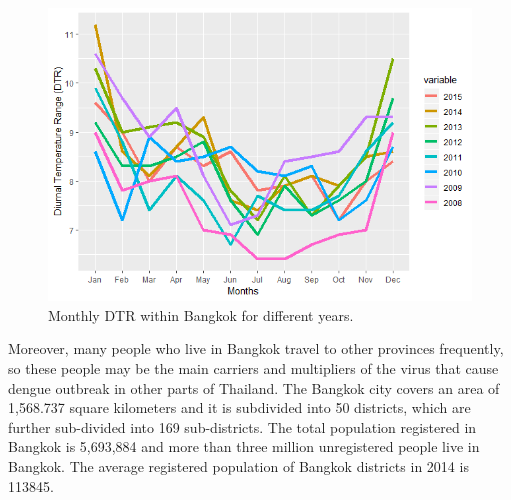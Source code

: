 \documentclass{bmcart}
\begin{document}
\begin{figure}[htbp]
	\begin{center}
		\includegraphics[width= 1.0\textwidth]{2-AvgMonthlyDTR}
		\caption{Monthly DTR within Bangkok for different years.}
		\label{figure-avg_temp_bangkok}
	\end{center}
\end{figure}


Moreover, many people who live in Bangkok travel to other provinces frequently, so these people may be the main carriers and multipliers of the virus that cause dengue outbreak in other parts of Thailand. The Bangkok city covers an area of 1,568.737 square kilometers and it is subdivided into 50 districts, which are further sub-divided into 169 sub-districts. The total population registered in Bangkok is 5,693,884 and more than three million unregistered people live in Bangkok. The average registered population of Bangkok districts in 2014 is 113845. 



\end{document}
